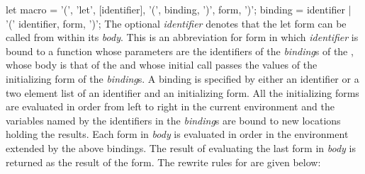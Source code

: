 \begin{optDefinition}
%
\Syntax
\savesyntax{}\vbox{\small\syntax
let macro
   = '(', 'let', [identifier], '(', {binding}, ')',
     {form}, ')';
binding
   = identifier
   | '(' identifier, form, ')';
\endsyntax}
%
\remarks%
The optional {\em identifier}\/ denotes that the let form can be called from
within its {\em body}.  This is an abbreviation for  form in
which {\em identifier} is bound to a function whose parameters are the
identifiers of the {\em binding\/}s of the , whose body is that of
the  and whose initial call passes the values of the initializing
form of the {\em binding\/}s.  A binding is specified by either an identifier or
a two element list of an identifier and an initializing form.  All the
initializing forms are evaluated in order from left to right in the current
environment and the variables named by the identifiers in the {\em binding}s are
bound to new locations holding the results.  Each form in {\em body} is
evaluated in order in the environment extended by the above bindings.  The
result of evaluating the last form in {\em body} is returned as the result of
the  form.  The rewrite rules for  are given below:


\end{optDefinition}
